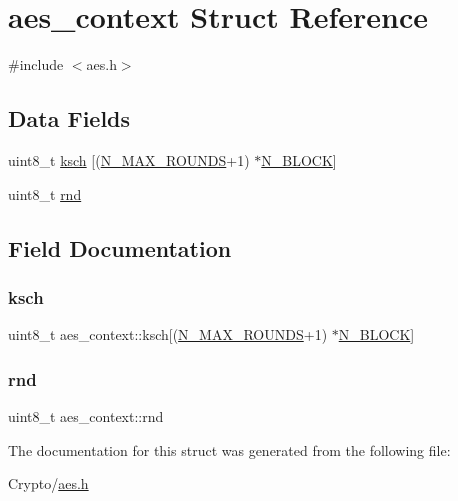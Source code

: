 \hypertarget{structaes__context}{}\section{aes\+\_\+context Struct Reference}
\label{structaes__context}


{\ttfamily \#include $<$aes.\+h$>$}

\subsection*{Data Fields}
\begin{DoxyCompactItemize}
\item 
uint8\+\_\+t \hyperlink{structaes__context_ab476c78bbf83cabeb637d33c43cc35ee}{ksch} \mbox{[}(\hyperlink{aes_8h_af8b900ecc3a113f2aed001ac9e1cb11e}{N\+\_\+\+M\+A\+X\+\_\+\+R\+O\+U\+N\+DS}+1) $\ast$\hyperlink{aes_8h_a64c8b1a34c03210cc4c214735bb4f186}{N\+\_\+\+B\+L\+O\+CK}\mbox{]}
\item 
uint8\+\_\+t \hyperlink{structaes__context_ab762dfbe068d5ecc737d864d00459fa0}{rnd}
\end{DoxyCompactItemize}


\subsection{Field Documentation}
\mbox{\label{structaes__context_ab476c78bbf83cabeb637d33c43cc35ee}} 
\subsubsection{\texorpdfstring{ksch}{ksch}}
{\footnotesize\ttfamily uint8\+\_\+t aes\+\_\+context\+::ksch\mbox{[}(\hyperlink{aes_8h_af8b900ecc3a113f2aed001ac9e1cb11e}{N\+\_\+\+M\+A\+X\+\_\+\+R\+O\+U\+N\+DS}+1) $\ast$\hyperlink{aes_8h_a64c8b1a34c03210cc4c214735bb4f186}{N\+\_\+\+B\+L\+O\+CK}\mbox{]}}

\mbox{\label{structaes__context_ab762dfbe068d5ecc737d864d00459fa0}} 
\subsubsection{\texorpdfstring{rnd}{rnd}}
{\footnotesize\ttfamily uint8\+\_\+t aes\+\_\+context\+::rnd}



The documentation for this struct was generated from the following file\+:\begin{DoxyCompactItemize}
\item 
Crypto/\hyperlink{aes_8h}{aes.\+h}\end{DoxyCompactItemize}
